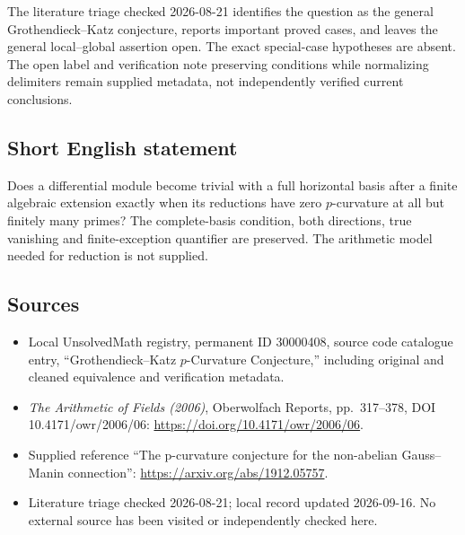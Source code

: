 \documentclass[11pt]{article}
\begin{document}
The literature triage checked 2026-08-21 identifies the question as the general Grothendieck--Katz conjecture, reports important proved cases, and leaves the general local--global assertion open. The exact special-case hypotheses are absent. The open label and verification note preserving conditions while normalizing delimiters remain supplied metadata, not independently verified current conclusions.
\subsection{Short English statement}
Does a differential module become trivial with a full horizontal basis after a finite algebraic extension exactly when its reductions have zero \(p\)-curvature at all but finitely many primes? The complete-basis condition, both directions, true vanishing and finite-exception quantifier are preserved. The arithmetic model needed for reduction is not supplied.
\subsection{Sources}
\begin{itemize}
\item Local UnsolvedMath registry, permanent ID 30000408, source code catalogue entry, ``Grothendieck--Katz \(p\)-Curvature Conjecture,'' including original and cleaned equivalence and verification metadata.
\item \emph{The Arithmetic of Fields (2006)}, Oberwolfach Reports, pp.\ 317--378, DOI 10.4171/owr/2006/06: \url{https://doi.org/10.4171/owr/2006/06}.
\item Supplied reference ``The p-curvature conjecture for the non-abelian Gauss--Manin connection'': \url{https://arxiv.org/abs/1912.05757}.
\item Literature triage checked 2026-08-21; local record updated 2026-09-16. No external source has been visited or independently checked here.
\end{itemize}
\end{document}
